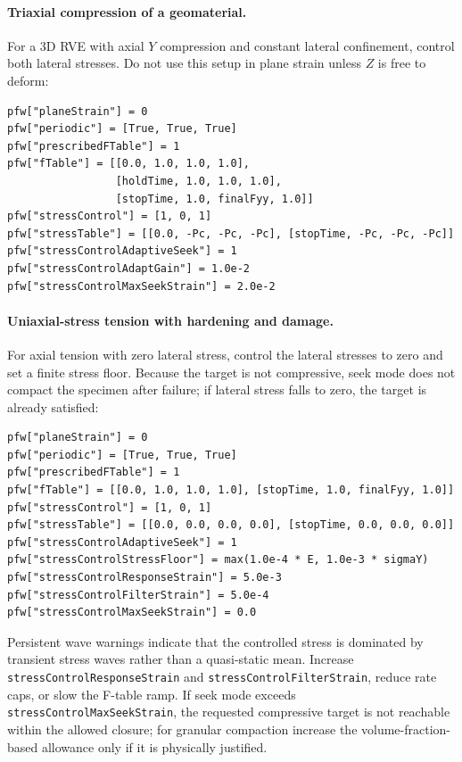 \paragraph{Triaxial compression of a geomaterial.}
For a 3D RVE with axial $Y$ compression and constant lateral confinement, control
both lateral stresses.  Do not use this setup in plane strain unless $Z$ is free
to deform:
\begin{lstlisting}[caption={RVE triaxial compression with X/Z confining pressure.}]
pfw["planeStrain"] = 0
pfw["periodic"] = [True, True, True]
pfw["prescribedFTable"] = 1
pfw["fTable"] = [[0.0, 1.0, 1.0, 1.0],
                 [holdTime, 1.0, 1.0, 1.0],
                 [stopTime, 1.0, finalFyy, 1.0]]
pfw["stressControl"] = [1, 0, 1]
pfw["stressTable"] = [[0.0, -Pc, -Pc, -Pc], [stopTime, -Pc, -Pc, -Pc]]
pfw["stressControlAdaptiveSeek"] = 1
pfw["stressControlAdaptGain"] = 1.0e-2
pfw["stressControlMaxSeekStrain"] = 2.0e-2
\end{lstlisting}

\paragraph{Uniaxial-stress tension with hardening and damage.}
For axial tension with zero lateral stress, control the lateral stresses to zero
and set a finite stress floor.  Because the target is not compressive, seek mode
does not compact the specimen after failure; if lateral stress falls to zero,
the target is already satisfied:
\begin{lstlisting}[caption={Uniaxial-stress tension with zero lateral stress.}]
pfw["planeStrain"] = 0
pfw["periodic"] = [True, True, True]
pfw["prescribedFTable"] = 1
pfw["fTable"] = [[0.0, 1.0, 1.0, 1.0], [stopTime, 1.0, finalFyy, 1.0]]
pfw["stressControl"] = [1, 0, 1]
pfw["stressTable"] = [[0.0, 0.0, 0.0, 0.0], [stopTime, 0.0, 0.0, 0.0]]
pfw["stressControlAdaptiveSeek"] = 1
pfw["stressControlStressFloor"] = max(1.0e-4 * E, 1.0e-3 * sigmaY)
pfw["stressControlResponseStrain"] = 5.0e-3
pfw["stressControlFilterStrain"] = 5.0e-4
pfw["stressControlMaxSeekStrain"] = 0.0
\end{lstlisting}

Persistent wave warnings indicate that the controlled stress is dominated by
transient stress waves rather than a quasi-static mean.  Increase
\texttt{stressControlResponseStrain} and \texttt{stressControlFilterStrain},
reduce rate caps, or slow the F-table ramp.  If seek mode exceeds
\texttt{stressControlMaxSeekStrain}, the requested compressive target is not
reachable within the allowed closure; for granular compaction increase the
volume-fraction-based allowance only if it is physically justified.


